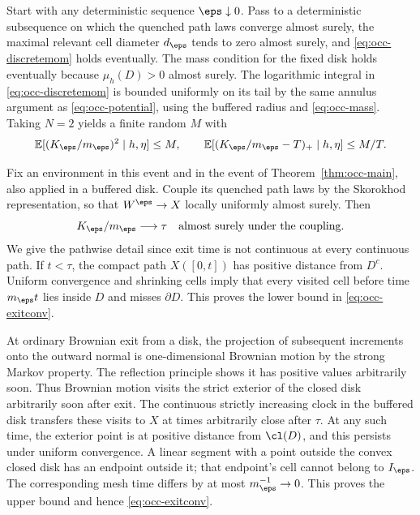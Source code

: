 Start with any deterministic sequence $\eps\downarrow0$.
Pass to a deterministic subsequence on
which the quenched path laws converge almost surely, the maximal
relevant cell diameter $d_\eps$ tends to zero almost surely, and
\eqref{eq:occ-discretemom} holds eventually. The mass condition for the
fixed disk holds eventually because $\mu_h(D)>0$ almost surely.
The logarithmic integral in \eqref{eq:occ-discretemom} is bounded uniformly
on its tail by the same annulus argument as \eqref{eq:occ-potential},
using the buffered radius and \eqref{eq:occ-mass}. Taking $N=2$ yields
a finite random $M$ with
\begin{equation}\label{eq:occ-UI}
 \mathbb{E}[(K_\eps/m_\eps)^2\mid h,\eta]\leq M,\qquad
 \mathbb{E}[(K_\eps/m_\eps-T)_+\mid h,\eta]\leq M/T .
\end{equation}

Fix an environment in this event and in the event of
Theorem~\ref{thm:occ-main}, also applied in a buffered disk. Couple its
quenched path laws by the Skorokhod representation, so that
$W^\eps\to X$ locally uniformly almost surely. Then
\begin{equation}\label{eq:occ-exitconv}
 K_\eps/m_\eps\longrightarrow\tau
       \quad\text{almost surely under the coupling}.
\end{equation}
We give the pathwise detail since exit time is not continuous at
every continuous path. If $t<\tau$, the compact path $X([0,t])$
has positive distance from $D^c$. Uniform convergence and shrinking
cells imply that every visited cell before time $m_\eps t$ lies
inside $D$ and misses $\partial D$. This proves the lower bound
in \eqref{eq:occ-exitconv}.

At ordinary Brownian exit from a disk, the projection of subsequent
increments onto the outward normal is one-dimensional Brownian
motion by the strong Markov property. The reflection principle
shows it has positive values arbitrarily soon. Thus Brownian motion
visits the strict exterior of the closed disk arbitrarily soon after
exit. The continuous strictly increasing clock in the buffered disk
transfers these visits to $X$ at times arbitrarily close after
$\tau$. At any such time, the exterior point is at positive distance
from $\cl(D)$, and this persists under uniform convergence.
A linear segment with a point outside the convex closed disk has
an endpoint outside it; that endpoint's cell cannot belong to
$I_\eps$. The corresponding mesh time differs by at most
$m_\eps^{-1}\to0$. This proves the upper bound and hence
\eqref{eq:occ-exitconv}.

